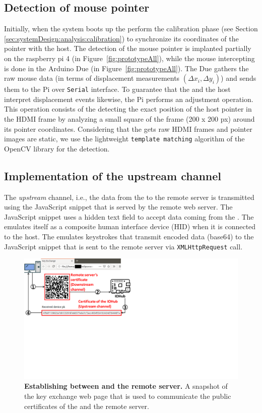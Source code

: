 \subsection{Detection of mouse pointer}
\label{sec:prototype:impl:mouse}
%
Initially, when the system boots up the \device perform the calibration phase (see Section \ref{sec:systemDesign:analysis:calibration}) to synchronize its coordinates of the pointer with the host. The detection of the mouse pointer is implanted partially on the raspberry pi 4 (\six in Figure~\ref{fig:prototypeAll}), while the mouse intercepting is done in the Arduino Due (\three in Figure~\ref{fig:prototypeAll}). The Due gathers the raw mouse data (in terms of displacement measurements $(\Delta x_i, \Delta y_i)$) and sends them to the Pi over \texttt{Serial} interface.  To guarantee that the \device and the host interpret displacement events likewise, the Pi performs an adjustment operation. This operation consists of the \device detecting the exact position of the host pointer in the HDMI frame by analyzing a small square of the frame (200 x 200 px) around its pointer coordinates. Considering that the \device gets raw HDMI frames and pointer images are static, we use the lightweight \texttt{template matching} algorithm of the OpenCV library for the detection.

\subsection{Implementation of the upstream channel}
\label{sec:prototype:impl:upstream}
%
The \emph{upstream} channel, i.e., the data from the \device to the remote server is transmitted using the \name JavaScript snippet that is served by the remote web server. The \name JavaScript snippet uses a hidden text field to accept data coming from the \device. The \device emulates itself as a composite human interface device (HID) when it is connected to the host. The \device emulates keystrokes that transmit encoded data (base64) to the \name JavaScript snippet that is sent to the remote server via \texttt{XMLHttpRequest} call.

\begin{figure}[t]
\centering
\includegraphics[trim={0 10cm 17cm 0}, clip, width=0.8\linewidth]{chapters/ProtectIOn/images/keyExchange_1.pdf}
\caption[Establishing \tls between \device and the remote server]{\textbf{Establishing \tls between \device and the remote server.} A snapshot of the key exchange web page that is used to communicate the public certificates of the \device and the remote server.}
\label{fig:keyExchange}
\centering
\end{figure} 

